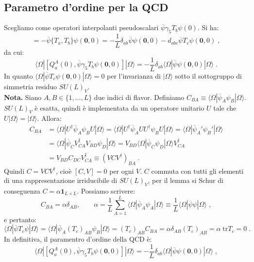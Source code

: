 \documentclass[12pt,a4paper]{article}
\theoremstyle{definition}
\newcommand{\bra}{\langle}
\newcommand{\ket}{\rangle}
\newcommand{\adj}[1]{#1^{\dagger}}
\newcommand{\tr}{\mathrm{tr}}
\numberwithin{equation}{section}
\begin{document}
\subsection{Parametro d'ordine per la QCD}
Scegliamo come operatori interpolanti pseudoscalari $\overline{\psi}\gamma_5T_b\psi(0)$. Si ha:
\begin{equation}
[Q_a^A(0),\overline{\psi}\gamma_5T_b\psi(0)]=-\overline{\psi}\{T_a,T_b\}\psi(\mathbf{0},0)=-\frac{1}{L}\delta_{ab}\overline{\psi}\psi(\mathbf{0},0)-d_{abc}\overline{\psi}T_c\psi(\mathbf{0},0)\;,
\end{equation}
da cui:
\begin{equation}
\bra\Omega|[Q_a^A(0),\overline{\psi}\gamma_5T_b\psi(\mathbf{0},0)]|\Omega\ket=-\frac{1}{L}\delta_{ab}\bra\Omega|\overline{\psi}\psi(\mathbf{0},0)|\Omega\ket\;.
\end{equation}
In quanto $\bra\Omega|\overline{\psi}T_c\psi(\mathbf{0},0)|\Omega\ket=0$ per l'invarianza di $|\Omega\ket$ sotto il sottogruppo di simmetria residuo $SU(L)_V$. \\
\textbf{Nota.} Siano $A,B\in \{1,\ldots,L\}$ due indici di flavor. Definiamo $C_{BA}\equiv \bra\Omega|\overline{\psi}_A\psi_B|\Omega\ket$. $SU(L)_V$ è esatta, quindi è implementata da un operatore unitario $U$ tale che $U|\Omega\ket=|\Omega\ket$. Allora:
\begin{align*}
C_{BA}&=\bra\Omega|\adj{U}\overline{\psi}_A\psi_B U|\Omega\ket=\bra\Omega|\adj{U}\overline{\psi}_AU\adj{U}\psi_BU|\Omega\ket=\bra\Omega|\overline{\psi}_A'\psi_B'|\Omega\ket \\
&= \bra\Omega|\overline{\psi}_C\adj{V}_{CA}V_{BD}\psi_D|\Omega\ket=V_{BD}\bra\Omega|\overline{\psi}_C\psi_D|\Omega\ket\adj{V}_{CA} \\
&= V_{BD}C_{DC}\adj{V}_{CA}\equiv (VC\adj{V})_{BA}\;.
\end{align*}
Quindi $C=VC\adj{V}$, cioè $[C,V]=0$ per ogni $V$. $C$ commuta con tutti gli elementi di una rappresentazione irriducibile di $SU(L)_V$, per il lemma si Schur di conseguenza $C=\alpha \mathbf{1}_{L\times L}$. Possiamo scrivere:
$$
C_{BA}=\alpha\delta_{AB},\qquad \alpha=\frac{1}{L}\sum_{A=1}^L\bra\Omega|\overline{\psi}_A\psi_A|\Omega\ket\equiv \frac{1}{L}\bra\Omega|\overline{\psi}\psi|\Omega\ket\;,
$$
e pertanto:
$$
\bra\Omega|\overline{\psi}T_c\psi|\Omega\ket=\bra\Omega|\overline{\psi}_A(T_c)_{AB}\psi_B|\Omega\ket=(T_c)_{AB}C_{BA}=\alpha\delta_{AB}(T_c)_{AB}=\alpha\;\tr T_c=0\;.
$$
In definitiva, il paramentro d'ordine della QCD è:
\begin{equation}
\bra\Omega|[Q_a^A(0),\overline{\psi}\gamma_5T_b\psi(\mathbf{0},0)]|\Omega\ket=-\frac{1}{L}\delta_{ab}\bra\Omega|\overline{\psi}\psi(\mathbf{0},0)|\Omega\ket\;,
\end{equation}
\end{document}
